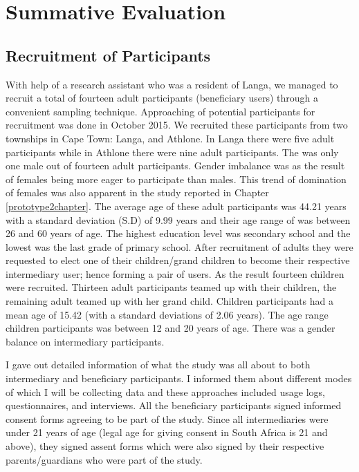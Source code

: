 
\chapter{Summative Evaluation} %

\label{summativeevalchapter} %


\section{Recruitment of Participants}
With help of a research assistant who was a resident of Langa,  we managed to recruit a total of fourteen adult participants (beneficiary users) through a convenient sampling technique. Approaching of potential participants for recruitment was done in October 2015. We recruited these participants from two townships in Cape Town: Langa, and Athlone. In Langa there were five adult participants while in Athlone there were nine adult participants. The was only one male out of fourteen adult participants. Gender imbalance was as the result of females being more eager to participate than males. This trend of domination of females was also apparent in the study reported in Chapter \ref{prototype2chapter}. The average age of these adult participants was 44.21 years with a standard deviation (S.D) of 9.99 years and their age range of was between 26 and 60 years of age. The highest education level was secondary school and the lowest was the last grade of primary school. After recruitment of adults they were requested to elect one of their children/grand children to become their respective intermediary user; hence forming a pair of users. As the result fourteen children were recruited. Thirteen adult participants teamed up with their children, the remaining adult teamed up with her grand child. Children participants had a mean age of 15.42 (with a standard deviations of 2.06 years). The age range children participants was between 12  and 20 years of age. There was a gender balance on intermediary participants. 

I gave out detailed information of what the study was all about to both intermediary and beneficiary participants. I informed them about different modes of which I will be collecting data and these approaches included usage logs, questionnaires, and interviews. All the beneficiary participants signed informed consent forms agreeing to be part of the study. Since all intermediaries were under 21 years of age (legal age for giving consent in South Africa is 21 and above), they signed assent forms which were also signed by their respective parents/guardians who were part of the study.

